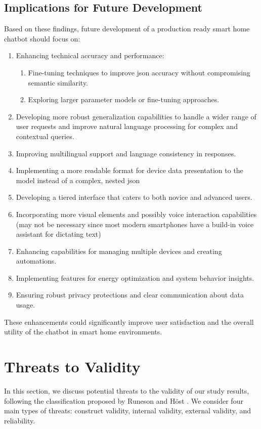 \subsection{Implications for Future Development}
Based on these findings, future development of a production ready smart home chatbot should focus on:
\begin{enumerate}
    \item Enhancing technical accuracy and performance:
    \begin{enumerate}
    \item Fine-tuning techniques to improve \gls{json} accuracy without compromising semantic similarity.
    \item Exploring larger parameter models or fine-tuning approaches.
    \end{enumerate}
    \item Developing more robust generalization capabilities to handle a wider range of user requests and improve natural language processing for complex and contextual queries.
    \item Improving multilingual support and language consistency in responses.
    \item Implementing a more readable format for device data presentation to the model instead of a complex, nested \gls{json}
    \item Developing a tiered interface that caters to both novice and advanced users.
    \item Incorporating more visual elements and possibly voice interaction capabilities (may not be necessary since most modern smartphones have a build-in voice assistant for dictating text)
    \item Enhancing capabilities for managing multiple devices and creating automations.
    \item Implementing features for energy optimization and system behavior insights.
    \item Ensuring robust privacy protections and clear communication about data usage.
    \end{enumerate}

These enhancements could significantly improve user satisfaction and the overall utility of the chatbot in smart home environments.


\section{Threats to Validity}
In this section, we discuss potential threats to the validity of our study results, following the classification proposed by Runeson and Höst \cite{DBLP:journals/ese/RunesonH09}. We consider four main types of threats: construct validity, internal validity, external validity, and reliability.

